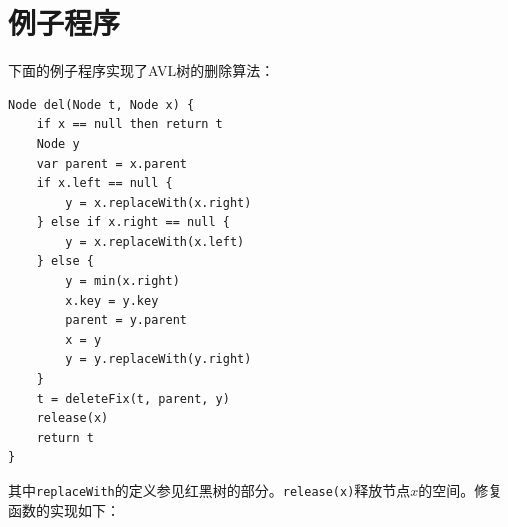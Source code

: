 \documentclass[b5paper]{ctexart}
\begin{document}

\section{例子程序}

下面的例子程序实现了AVL树的删除算法：

\begin{lstlisting}[language = Bourbaki]
Node del(Node t, Node x) {
    if x == null then return t
    Node y
    var parent = x.parent
    if x.left == null {
        y = x.replaceWith(x.right)
    } else if x.right == null {
        y = x.replaceWith(x.left)
    } else {
        y = min(x.right)
        x.key = y.key
        parent = y.parent
        x = y
        y = y.replaceWith(y.right)
    }
    t = deleteFix(t, parent, y)
    release(x)
    return t
}
\end{lstlisting}

其中\texttt{replaceWith}的定义参见红黑树的部分。\texttt{release(x)}释放节点$x$的空间。修复函数的实现如下：
\end{document}
